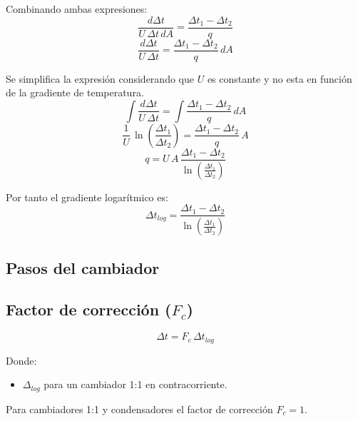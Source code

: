 Combinando ambas expresiones:
\begin{equation*}
    \frac{d\Delta t}{U\,\Delta t\,dA} = \frac{\Delta t_1 - \Delta t_2}{q}
\end{equation*}
\begin{equation*}
    \frac{d\Delta t}{U\,\Delta t} = \frac{\Delta t_1 - \Delta t_2}{q}\,dA
\end{equation*}

Se simplifica la expresión considerando que $U$ es constante y no esta en
función de la gradiente de temperatura.
\begin{equation*}
    \int\frac{d\Delta t}{U\,\Delta t} = \int\frac{\Delta t_1 - \Delta t_2}{q}\,dA
\end{equation*}
\begin{equation*}
    \frac{1}{U}\,\ln\left(\frac{\Delta t_1}{\Delta t_2}\right) = \frac{\Delta t_1 - \Delta t_2}{q}\,A
\end{equation*}
\begin{equation*}
    q = U\,A\,\frac{\Delta t_1 - \Delta t_2}{\ln\left(\frac{\Delta t_1}{\Delta t_2}\right)}
\end{equation*}

Por tanto el gradiente logarítmico es:
\begin{equation}
    \Delta t_{log} = \frac{\Delta t_1 - \Delta t_2}{\ln\left(\frac{\Delta t_1}{\Delta t_2}\right)}
\end{equation}

\subsection{Pasos del cambiador}


\subsection{Factor de corrección ($F_c$)}

\begin{equation*}
    \Delta t = F_c\,\Delta t_{log}
\end{equation*}

Donde:
\begin{itemize}
    \item $\Delta_{log}$ para un cambiador 1:1 en contracorriente.
\end{itemize}

Para cambiadores 1:1 y condensadores el factor de corrección $F_c = 1$.

